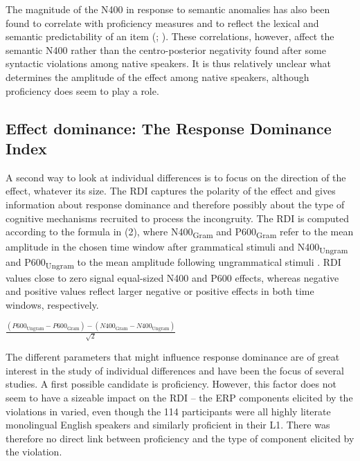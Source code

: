 \documentclass[output=paper,colorlinks,citecolor=brown,modfonts,nonflat]{../langscibook}
\begin{document}
\largerpage[2]
The magnitude of the N400 in response to semantic anomalies has also been found to correlate with proficiency measures \citep{NewmanEtAl2012} and to reflect the lexical and semantic predictability of an item (\citealt{FedermeierKutas1999}; \citealt{DeLongEtAl2005,Federmeier2007}). These correlations, however, affect the semantic N400 rather than the centro-posterior negativity found after some syntactic violations among native speakers. It is thus relatively unclear what determines the amplitude of the effect among native speakers, although proficiency does seem to play a role.

\subsection{Effect dominance: The Response Dominance Index}
\largerpage

A second way to look at individual differences is to focus on the direction of the effect, whatever its size. The RDI captures the polarity of the effect and gives information about response dominance and therefore possibly about the type of cognitive mechanisms recruited to process the incongruity. The RDI is computed according to the formula in (2), where N400\textsubscript{Gram} and P600\textsubscript{Gram} refer to the mean amplitude in the chosen time window after grammatical stimuli and N400\textsubscript{Ungram} and P600\textsubscript{Ungram} to the mean amplitude following ungrammatical stimuli \citep{TannerEtAl2014}. RDI values close to zero signal equal-sized N400 and P600 effects, whereas negative and positive values reflect larger negative or positive effects in both time windows, respectively. \label{bkm:Ref4495949}

\ea
$\frac{\left(P600_{{\text{Ungram}}}-P600_{{\text{Gram}}}\right)-\left(N400_{{\text{Gram}}}-N400_{{\text{Ungram}}}\right)}{\sqrt 2}$
\z

The different parameters that might influence response dominance are of great interest in the study of individual differences and have been the focus of several studies. A first possible candidate is proficiency. However, this factor does not seem to have a sizeable impact on the RDI – the ERP components elicited by the violations in \citet{Tanner2019} varied, even though the 114 participants were all highly literate monolingual English speakers and similarly proficient in their L1. There was therefore no direct link between proficiency and the type of component elicited by the violation. 
\end{document}
